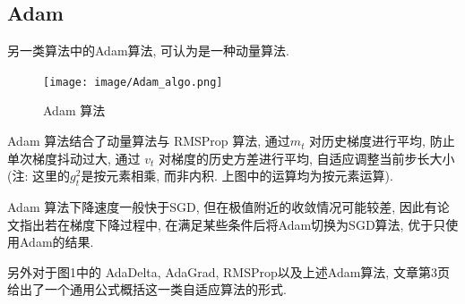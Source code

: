 \documentclass{article}
\begin{document}
\subsection*{Adam}
另一类算法中的Adam算法, 可认为是一种动量算法.
\begin{figure}[h!]
    \centering
    \texttt{[image: image/Adam\_algo.png]}
    \caption{Adam 算法}
    \label{fig:Adam}
\end{figure}
Adam 算法结合了动量算法与 RMSProp 算法, 通过$m_t$ 对历史梯度进行平均, 防止单次梯度抖动过大, 通过 $v_t$ 对梯度的历史方差进行平均, 自适应调整当前步长大小(注: 这里的$g_t^2$是按元素相乘, 而非内积. 上图中的运算均为按元素运算). 

Adam 算法下降速度一般快于SGD, 但在极值附近的收敛情况可能较差\cite{reddiConvergenceAdam2019}, 因此有论文指出若在梯度下降过程中, 在满足某些条件后将Adam切换为SGD算法, 优于只使用Adam的结果\cite{keskarImprovingGeneralizationPerformance2017}.

另外对于图1中的 AdaDelta, AdaGrad, RMSProp以及上述Adam算法, 文章\citet{reddiConvergenceAdam2019}第3页给出了一个通用公式概括这一类自适应算法的形式.
\end{document}

